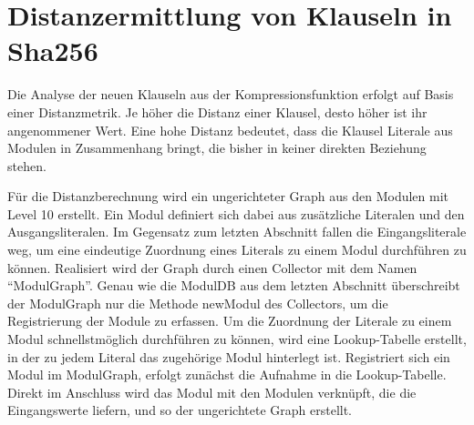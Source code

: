\section{Distanzermittlung von Klauseln in Sha256}
\label{sec:ana:distance}

Die Analyse der neuen Klauseln aus der Kompressionsfunktion erfolgt auf Basis einer Distanzmetrik. Je höher die Distanz einer Klausel, desto höher
ist ihr angenommener Wert. Eine hohe Distanz bedeutet, dass die Klausel Literale aus Modulen in Zusammenhang bringt, die bisher in keiner direkten
Beziehung stehen.

Für die Distanzberechnung wird ein ungerichteter Graph aus den Modulen mit Level 10 erstellt. Ein Modul definiert sich dabei aus zusätzliche Literalen
und den Ausgangsliteralen. Im Gegensatz zum letzten Abschnitt fallen die Eingangsliterale weg, um eine eindeutige Zuordnung eines Literals zu einem
Modul durchführen zu können. Realisiert wird der Graph durch einen Collector mit dem Namen "`ModulGraph"'. Genau wie die ModulDB aus dem letzten Abschnitt
überschreibt der ModulGraph nur die Methode newModul des Collectors, um die Registrierung der Module zu erfassen. Um die Zuordnung der Literale zu einem
Modul schnellstmöglich durchführen zu können, wird eine Lookup-Tabelle erstellt, in der zu jedem Literal das zugehörige Modul hinterlegt ist. Registriert
sich ein Modul im ModulGraph, erfolgt zunächst die Aufnahme in die Lookup-Tabelle. Direkt im Anschluss wird das Modul mit den Modulen verknüpft, die die
Eingangswerte liefern, und so der ungerichtete Graph erstellt.

